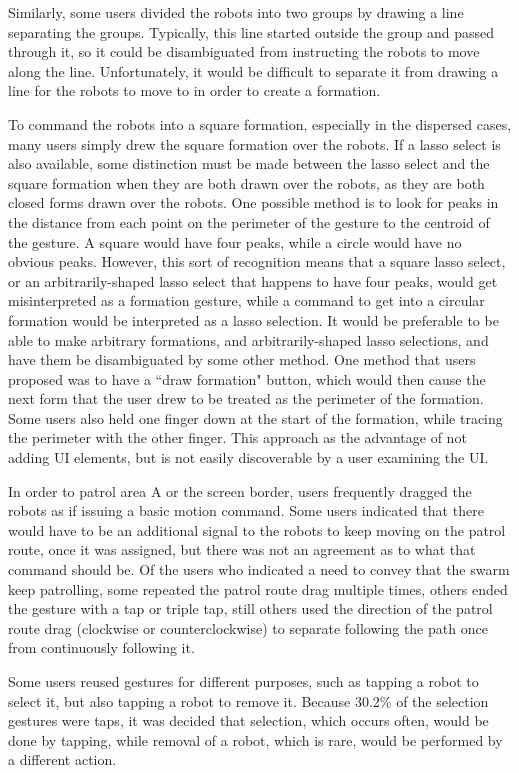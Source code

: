 Similarly, some users divided the robots into two groups by drawing a line separating the groups.
Typically, this line started outside the group and passed through it, so it could be disambiguated from instructing the robots to move along the line.
Unfortunately, it would be difficult to separate it from drawing a line for the robots to move to in order to create a formation.
 
To command the robots into a square formation, especially in the dispersed cases, many users simply drew the square formation over the robots.
If a lasso select is also available, some distinction must be made between the lasso select and the square formation when they are both drawn over the robots, as they are both closed forms drawn over the robots.
One possible method is to look for peaks in the distance from each point on the perimeter of the gesture to the centroid of the gesture. 
A square would have four peaks, while a circle would have no obvious peaks. 
However, this sort of recognition means that a square lasso select, or an arbitrarily-shaped lasso select that happens to have four peaks, would get misinterpreted as a formation gesture, while a command to get into a circular formation would be interpreted as a lasso selection. 
It would be preferable to be able to make arbitrary formations, and arbitrarily-shaped lasso selections, and have them be disambiguated by some other method. 
One method that users proposed was to have a ``draw formation" button, which would then cause the next form that the user drew to be treated as the perimeter of the formation. 
Some users also held one finger down at the start of the formation, while tracing the perimeter with the other finger. 
This approach as the advantage of not adding UI elements, but is not easily discoverable by a user examining the UI. 

In order to patrol area A or the screen border, users frequently dragged the robots as if issuing a basic motion command. 
Some users indicated that there would have to be an additional signal to the robots to keep moving on the patrol route, once it was assigned, but there was not an agreement as to what that command should be. 
Of the users who indicated a need to convey that the swarm keep patrolling, some repeated the patrol route drag multiple times, others ended the gesture with a tap or triple tap, still others used the direction of the patrol route drag (clockwise or counterclockwise) to separate following the path once from continuously following it. 

Some users reused gestures for different purposes, such as tapping a robot to select it, but also tapping a robot to remove it.
Because 30.2\% of the selection gestures were taps, it was decided that selection, which occurs often, would be done by tapping, while removal of a robot, which is rare, would be performed by a different action. 


